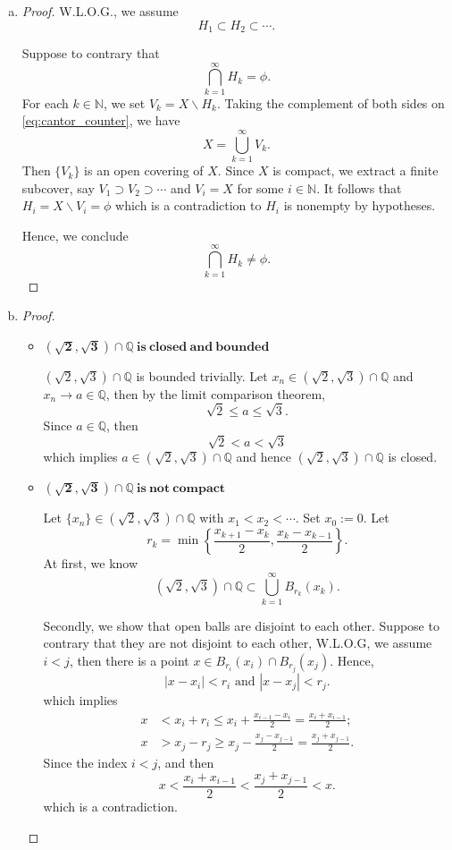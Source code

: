 \begin{Exercise}
\begin{enumerate}[a)]
\item
\begin{proof}
W.L.O.G., we assume
$$
H_1 \subset H_2 \subset \cdots.
$$

Suppose to contrary that
\begin{equation}\label{eq:cantor_counter}
\bigcap_{k=1}^{\infty}H_k = \phi.
\end{equation}
For each $k\in\mathbb{N}$, we set $V_k = X\backslash H_k$. Taking the complement of both sides on \eqref{eq:cantor_counter}, we have
$$
X = \bigcup_{k=1}^{\infty}V_k.
$$
Then $\{V_k\}$ is an open covering of $X$. Since $X$ is compact, we extract a finite subcover, say $V_1 \supset V_2 \supset \cdots$ and $V_i = X$ for some $i\in\mathbb{N}$. It follows that $H_i = X\backslash V_i = \phi$ which is a contradiction to $H_i$ is nonempty by hypotheses.

Hence, we conclude
$$
\bigcap_{k=1}^{\infty}H_k \neq \phi.
$$
\end{proof}

\item
\begin{proof}
\begin{itemize}
\item $\mathbf{(\sqrt{2}, \sqrt{3})\cap \mathbb{Q}\  is\ closed\ and\ bounded}$

$(\sqrt{2}, \sqrt{3})\cap \mathbb{Q}$ is bounded trivially. Let $x_n\in(\sqrt{2}, \sqrt{3})\cap \mathbb{Q}$ and $x_n\to a \in \mathbb{Q}$, then by the limit comparison theorem,
$$
\sqrt{2} \leq a \leq \sqrt{3}.
$$
Since $a\in\mathbb{Q}$, then
$$
\sqrt{2} < a < \sqrt{3}
$$
which implies $a\in(\sqrt{2}, \sqrt{3})\cap \mathbb{Q}$ and hence $(\sqrt{2}, \sqrt{3})\cap \mathbb{Q}$ is closed.

\item $\mathbf{(\sqrt{2}, \sqrt{3})\cap \mathbb{Q}\  is\ not\ compact}$

Let $\{x_n\}\in(\sqrt{2}, \sqrt{3})\cap \mathbb{Q}$ with $x_1<x_2<\cdots$. Set $x_0 := 0$. Let 
$$
r_k=\min\left\{\frac{x_{k+1}-x_k}{2}, \frac{x_k-x_{k-1}}{2}\right\}.
$$
At first, we know
$$
(\sqrt{2}, \sqrt{3})\cap \mathbb{Q} \subset \bigcup_{k=1}^{\infty} B_{r_k}(x_k).
$$

Secondly, we show that open balls are disjoint to each other. Suppose to contrary that they are not disjoint to each other, W.L.O.G, we assume $i<j$, then there is a point $x\in B_{r_i}(x_i)\cap B_{r_j}(x_j)$. Hence,
$$
\left| x-x_i \right| < r_i \text{ and } \left| x-x_j \right| < r_j.
$$
which implies
\begin{align*}
x &< x_i+r_i \leq x_i+\frac{x_{i-1}-x_i}{2} = \frac{x_i+x_{i-1}}{2}; \\
x &> x_j-r_j \geq x_j-\frac{x_j-x_{j-1}}{2} = \frac{x_j+x_{j-1}}{2}.
\end{align*}
Since the index $i<j$, and then
$$
x < \frac{x_i+x_{i-1}}{2} < \frac{x_j+x_{j-1}}{2} < x.
$$
which is a contradiction.


\end{itemize}
\end{proof}
\end{enumerate}
\end{Exercise}
